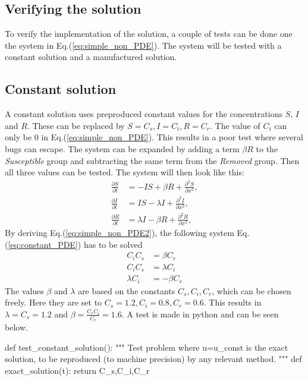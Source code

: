 \documentclass[%
twoside,                 %
final,                   %
10pt]{article}
\begin{document}
\subsection{Verifying the solution}
To verify the implementation of the solution, a couple of tests can be done one the system in Eq.(\ref{eq:simple_non_PDE}). The system will be tested with a constant solution and a manufactured solution.   

\subsection{Constant solution}
A constant solution uses preproduced constant values for the concentrations $S$, $I$ and $R$. These can be replaced by $S = C_s,I=C_i,R=C_r$. The value of $C_i$ can only be 0 in Eq.(\ref{eq:simple_non_PDE}). This results in a poor test where several bugs can escape. The system can be expanded by adding a term $\beta R$ to the \emph{Susceptible} group and subtracting the same term from the \emph{Removed} group. Then all three values can be tested. The system will then look like this: 
\begin{equation} \label{eq:simple_non_PDE2}
	\begin{aligned}
	\frac{\partial S}{\partial t} &= -IS + \beta R + \frac{\partial^2 S}{\partial x^2},\\
	\frac{\partial I}{\partial t} &= IS- \lambda I + \frac{\partial^2 I}{\partial x^2},\\
	\frac{\partial R}{\partial t} &= \lambda I - \beta R + \frac{\partial^2 R}{\partial x^2},
	\end{aligned}
\end{equation}
By deriving Eq.(\ref{eq:simple_non_PDE2}), the following system Eq.(\ref{eq:constant_PDE}) has to be solved
\begin{equation} \label{eq:constant_PDE}
	\begin{aligned}
	C_iC_s &= \beta C_r \\
	C_iC_s &= \lambda C_i \\
	\lambda C_i &= -\beta C_r 
	\end{aligned}
\end{equation}
The values $\beta$ and $\lambda$ are based on the constants $C_s,C_i,C_r$, which can be chosen freely. Here they are set to $C_s = 1.2,C_i=0.8,C_r=0.6$. This results in $\lambda= C_s = 1.2$ and $\beta= \frac{C_s C_i}{C_r}=1.6$. A test is made in python and can be seen below.

\bpycod
def test_constant_solution():
    """
    Test problem where u=u_const is the exact solution, to be
    reproduced (to machine precision) by any relevant method.
    """
    def exact_solution(t):
        return C_s,C_i,C_r
    
\end{document}
